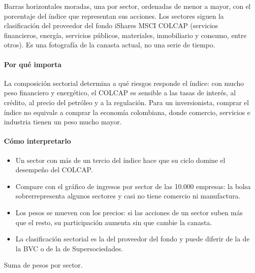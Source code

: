 \begin{leer}
Barras horizontales moradas, una por sector, ordenadas de menor a mayor, con el porcentaje del índice que representan sus acciones. Los sectores siguen la clasificación del proveedor del fondo iShares MSCI COLCAP (servicios financieros, energía, servicios públicos, materiales, inmobiliario y consumo, entre otros). Es una fotografía de la canasta actual, no una serie de tiempo.
\end{leer}

\paragraph{Por qué importa}
La composición sectorial determina a qué riesgos responde el índice: con mucho peso financiero y energético, el COLCAP es sensible a las tasas de interés, al crédito, al precio del petróleo y a la regulación. Para un inversionista, comprar el índice no equivale a comprar la economía colombiana, donde comercio, servicios e industria tienen un peso mucho mayor.

\paragraph{Cómo interpretarlo}
\begin{itemize}
\item Un sector con más de un tercio del índice hace que su ciclo domine el desempeño del COLCAP.
\item Compare con el gráfico de ingresos por sector de las 10.000 empresas: la bolsa sobrerrepresenta algunos sectores y casi no tiene comercio ni manufactura.
\item Los pesos se mueven con los precios: si las acciones de un sector suben más que el resto, su participación aumenta sin que cambie la canasta.
\item La clasificación sectorial es la del proveedor del fondo y puede diferir de la de la BVC o de la de Supersociedades.
\end{itemize}
\begin{formulas}[Fórmulas]
\end{formulas}
\begin{metodo}[Metodología]
Suma de pesos por sector.
\par{}
\end{metodo}

